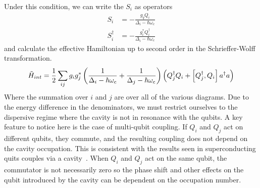 Under this condition, we can write the $S_i$ as operators
\begin{align}
    S_i         & = -\frac{g_qQ_i}{\Delta_i-\hbar\omega_c}           \\
    S_i^\dagger & = -\frac{g_i^*Q_i^\dagger}{\Delta_i-\hbar\omega_c}
\end{align}
and calculate the effective Hamiltonian up to second order in the Schrieffer-Wolff transformation.
\begin{equation}
    \tilde{H}_{int} = \frac{1}{2}\sum_{ij}g_ig_j^*\left(\frac{1}{\Delta_i-\hbar\omega_c}+\frac{1}{\Delta_j-\hbar\omega_c}\right)\left(Q_j^\dagger Q_i + \left[Q_j^\dagger,Q_i\right]a^\dagger a\right)
\end{equation}
Where the summation over $i$ and $j$ are over all of the various diagrams.
Due to the energy difference in the denominators, we must restrict ourselves to the dispersive regime where the cavity is not in resonance with the qubits.
A key feature to notice here is the case of multi-qubit coupling.
If $Q_i$ and $Q_j$ act on different qubits, they commute, and the resulting coupling does not depend on the cavity occupation.
This is consistent with the results seen in superconducting quits couples via a cavity~\cite{majer_2007}.
When $Q_i$ and $Q_j$ act on the same qubit, the commutator is not necessarily zero so the phase shift and other effects on the qubit introduced by the cavity can be dependent on the occupation number.
